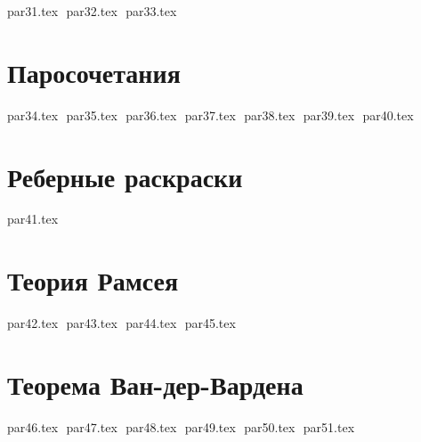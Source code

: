 {par31.tex}
$ $
{par32.tex}
$ $
{par33.tex}
$ $
\pagebreak

\section*{Паросочетания}

{par34.tex}
$ $
{par35.tex}
$ $
{par36.tex}
$ $
{par37.tex}
$ $
{par38.tex}
$ $
{par39.tex}
$ $
{par40.tex}
$ $
\pagebreak

\section*{Реберные раскраски}

{par41.tex}
$ $
\pagebreak

\section*{Теория Рамсея}

{par42.tex}
$ $
{par43.tex}
$ $
{par44.tex}
$ $
{par45.tex}
$ $
\pagebreak

\section*{Теорема Ван-дер-Вардена}

{par46.tex}
$ $
{par47.tex}
$ $
{par48.tex}
$ $
{par49.tex}
$ $
{par50.tex}
$ $
{par51.tex}
$ $
\pagebreak

 
